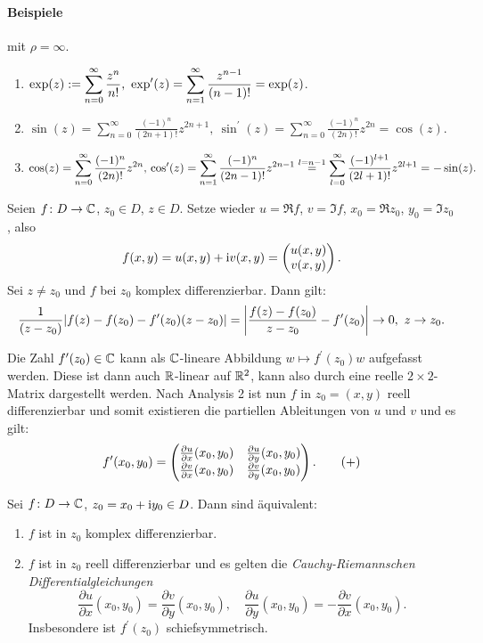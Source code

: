 \documentclass[a4paper,twoside,DIV15,BCOR12mm]{scrbook}
\begin{document}
\paragraph{Beispiele} mit $\rho = \infty$.\begin{enumerate}
\item $\displaystyle \exp(z) := \sum_{n=0}^\infty \frac{z^n}{n!},\ \exp^\prime(z) = \sum_{n=1}^\infty \frac{z^{n-1}}{(n-1)!} = \exp(z)$.
\item $\displaystyle \sin(z) = \sum_{n=0}^\infty \frac{(-1)^n}{(2n+1)!}z^{2n+1},\ \sin^\prime(z) = \sum_{n=0}^\infty \frac{(-1)^n}{(2n)!}z^{2n} = \cos(z).$
\item $\displaystyle \cos(z) = \sum_{n=0}^\infty \frac{(-1)^n}{(2n)!}z^{2n},\newline \cos^\prime(z) = \sum_{n=1}^\infty \frac{(-1)^n}{(2n-1)!}z^{2n-1} \stackrel{l=n-1}{=} \sum_{l=0}^\infty \frac{(-1)^{l+1}}{(2l+1)!}z^{2l+1} = -\sin(z).$
\end{enumerate}


\noindent Seien $f\colon D\rightarrow\mathbb{C}$, $z_0\in D$, $z\in D$. Setze wieder $u = \Re f$, $v = \Im f$, $x_0 = \Re z_0$, $y_0 = \Im z_0$, also
\[f(x,y) = u(x,y) + \mathrm{i} v(x,y) = \left(\!\!\!\begin{array}{c}u(x,y)\\v(x,y)\end{array}\!\!\!\right).\]
Sei $z\neq z_0$ und $f$ bei $z_0$ komplex differenzierbar. Dann gilt:
\[\frac{1}{(z-z_0)}|f(z)-f(z_0)-f^\prime(z_0)(z-z_0)| = \left|\frac{f(z)-f(z_0)}{z-z_0} - f^\prime(z_0)\right| \rightarrow 0,\ z\rightarrow z_0.\]

Die Zahl $f^\prime(z_0)\in\mathbb{C}$ kann als $\mathbb{C}$-lineare Abbildung $w\mapsto f^\prime(z_0)w$ aufgefasst werden. Diese ist dann auch $\mathbb{R}$-linear auf $\mathbb{R}^2$, kann also durch eine reelle $2\times 2$-Matrix dargestellt werden. Nach Analysis 2 ist nun $f$ in $z_0 = (x,y)$ reell differenzierbar und somit existieren die partiellen Ableitungen von $u$ und $v$ und es gilt:
\[f^\prime(x_0,y_0) = \left(\!\!\!\begin{array}{c c}\frac{\partial u}{\partial x} (x_0,y_0) & \frac{\partial u}{\partial y} (x_0,y_0)\\
\frac{\partial v}{\partial x} (x_0,y_0) & \frac{\partial v}{\partial y} (x_0,y_0)\end{array}\!\!\!\right).\tag{+}\]

\begin{satz} \label{satz1.4}
  Sei $f\colon D\rightarrow\mathbb{C}$, $z_0 = x_0 + \mathrm{i} y_0\in D$. Dann sind äquivalent:
\begin{enumerate}
\item $f$ ist in $z_0$ komplex differenzierbar.
\item $f$ ist in $z_0$ reell differenzierbar und es gelten die \emph{Cauchy-Riemannschen Differentialgleichungen}
\begin{equation} \label{CR}
\frac{\partial u}{\partial x} (x_0,y_0) = \frac{\partial v}{\partial y} (x_0,y_0),\quad \frac{\partial u}{\partial y} (x_0,y_0) =
-\frac{\partial v}{\partial x} (x_0,y_0). \tag{CR}
\end{equation}
Insbesondere ist $f^\prime(z_0)$ schiefsymmetrisch.
\end{enumerate}
\end{satz}
\end{document}
